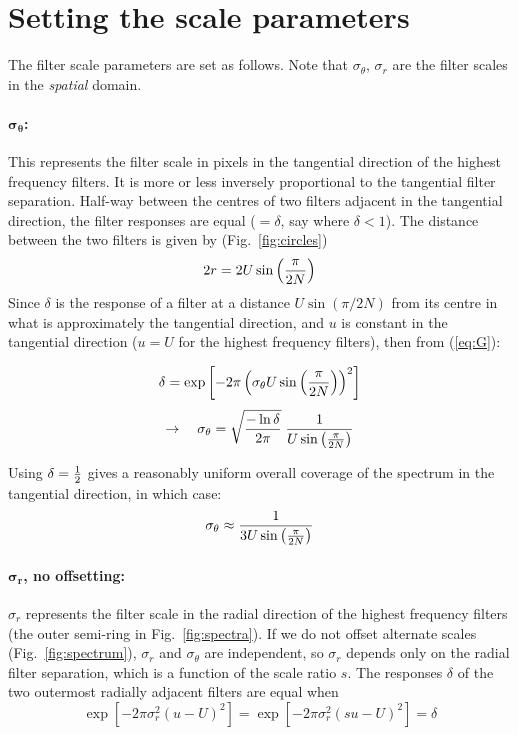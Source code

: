 \documentclass[12pt,a4]{article}
\begin{document}
\section{Setting the scale parameters}


The filter scale parameters are set as follows.  Note that $\sigma_\theta$, $\sigma_r$ are the filter scales in the {\em spatial} domain.  

\paragraph{$\mathbf{\sigma_\theta}$:} 
This represents the filter scale in pixels in the tangential direction of the highest frequency filters.  It is more or less inversely proportional to the tangential filter separation.  Half-way between the centres of two filters adjacent in the tangential direction, the filter responses are equal ($=\delta$, say where $\delta < 1$). The distance between the two filters is given by (Fig.~\ref{fig:circles})
\def\Sinpbnn{\sin{\left(\pi\over2N\right)}}
\[ 2r = 2U \Sinpbnn \]
Since  $\delta$ is the response of a filter at a distance $U\sin(\pi/2N)$ from its centre in what is approximately the tangential direction, and $u$ is constant in the tangential direction ($u = U$ for the highest frequency filters), then from (\ref{eq:G}):

\[ \delta = \exp \left[ -2\pi \left(\sigma_\theta U \Sinpbnn\right)^2  \right] \]
\[ \rightarrow\quad \sigma_\theta =
  \sqrt{-\ln\delta \over 2\pi}\; {1 \over U\Sinpbnn} 
\]

Using $\delta = {1\over2}$ gives a reasonably uniform overall coverage of the spectrum in the tangential direction, in which case:
\[ \sigma_\theta \approx {1 \over 3 U\Sinpbnn} \]

\paragraph{$\mathbf{\sigma_r}$, no offsetting:}
$\sigma_r$ represents the filter scale in the radial direction of the highest frequency filters (the outer semi-ring in Fig.~\ref{fig:spectra}).  If we do not offset alternate scales (Fig.~\ref{fig:spectrum}), $\sigma_r$ and $\sigma_\theta$ are independent, so $\sigma_r$ depends only on the radial filter separation, which is a function of the scale ratio $s$.  The responses $\delta$ of the two outermost radially adjacent filters are equal when
\[ \exp\left[ -2\pi \sigma_r^2 (u-U)^2\right]
= \exp\left[ -2\pi \sigma_r^2 \left(su-U\right)^2\right] = \delta \]
\end{document}
